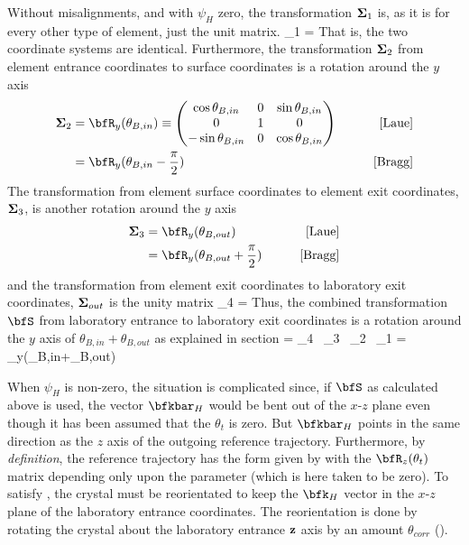Without misalignments, and with $\psi_H$ zero, the transformation
${\bf \Sigma}_1$ is, as it is for every other type of element,
just the unit matrix. 
\Begineq
  \Bf\Sigma_1 = \bfI
\Endeq
That is, the two coordinate systems are
identical. Furthermore, the transformation ${\bf \Sigma}_2$ from element
entrance coordinates to surface coordinates is a rotation around the $y$
axis
\begin{align}
  \Bf\Sigma_2 &= \bfR_y(\theta_{B,in}) \equiv \begin{pmatrix}
     \cos\theta_{B,in} & 0 & \sin\theta_{B,in} \\
     0                 & 1 & 0                 \\
    -\sin\theta_{B,in} & 0 & \cos\theta_{B,in} \\
  \end{pmatrix}
  \qquad &\text{[Laue]}
  \label{mt0t010} \\
  &= \bfR_y(\theta_{B,in} - \frac{\pi}{2})
  \qquad &\text{[Bragg]} \nonumber
\end{align}
The transformation from element surface coordinates to element exit
coordinates, ${\bf \Sigma}_3$, is another rotation around the $y$ axis 
\begin{align}
  \Bf\Sigma_3 &= \bfR_y(\theta_{B,out})
  \qquad &\text{[Laue]} \\
  &= \bfR_y(\theta_{B,out} + \frac{\pi}{2})
  \qquad &\text{[Bragg]} \nonumber
\end{align}
and the transformation from element exit coordinates
to laboratory exit coordinates, ${\bf \Sigma}_{out}$ is the unity matrix
\Begineq
  \Bf\Sigma_4 = \bfI
\Endeq
Thus, the combined transformation $\bfS$ from laboratory entrance to
laboratory exit coordinates is a rotation around the $y$ axis of
$\theta_{B,in}+\theta_{B,out}$ as explained in section
\Begineq
  \bfS = \Bf\Sigma_4 \, \Bf\Sigma_3 \, \Bf\Sigma_2 \, \Bf\Sigma_1 
  = \bfR_y(\theta_{B,in}+\theta_{B,out})
\Endeq

When $\psi_H$ is non-zero, the situation is complicated since, if
$\bfS$ as calculated above is used, the vector $\bfkbar_H$ would be
bent out of the $x$-$z$ plane even though it has been assumed that the
 $\theta_t$ is zero. But $\bfkbar_H$ points in the same
direction as the $z$ axis of the outgoing reference
trajectory. Furthermore, by {\em definition}, the reference trajectory
has the form given by  with the $\bfR_{z}(\theta_t)$ matrix
depending only upon the  parameter (which is here taken
to be zero). To satisfy , the crystal must be reorientated to
keep the $\bfk_H$ vector in the $x$-$z$ plane of the laboratory
entrance coordinates.  The reorientation is done by rotating the
crystal about the laboratory entrance ${\bf z}$ axis by an amount
$\theta_{corr}$ ().

